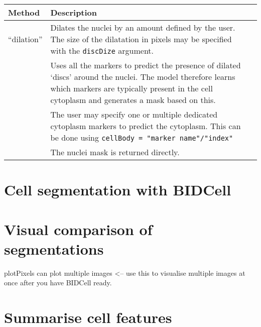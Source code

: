 \documentclass[
  letterpaper,
  DIV=11,
  numbers=noendperiod]{scrreprt}
\begin{document}
\begin{longtable}[]{@{}
  >{\raggedright\arraybackslash}p{}
  >{\centering\arraybackslash}p{}
  >{\centering\arraybackslash}p{}@{}}
\toprule\noalign{}
\begin{minipage}[b]{\linewidth}\raggedright
Method
\end{minipage} & \begin{minipage}[b]{\linewidth}\centering
Description
\end{minipage} & \begin{minipage}[b]{\linewidth}\centering
\end{minipage} \\
\midrule\noalign{}
\endhead
\bottomrule\noalign{}
\endlastfoot
{``dilation''} & {Dilates the nuclei by an amount defined by the user.
The size of the dilatation in pixels may be specified with the
\texttt{discDize} argument.} & \\
{``discModel''} & {Uses all the markers to predict the presence of
dilated `discs' around the nuclei. The model therefore learns which
markers are typically present in the cell cytoplasm and generates a mask
based on this.} & \\
{``marker''} & {The user may specify one or multiple dedicated cytoplasm
markers to predict the cytoplasm. This can be done using
\texttt{cellBody\ =\ "marker\ name"/"index"}} & \\
{``None''} & {The nuclei mask is returned directly.} & \\
\end{longtable}

\section{Cell segmentation with
BIDCell}\label{cell-segmentation-with-bidcell}

\section{Visual comparison of
segmentations}\label{visual-comparison-of-segmentations}

plotPixels can plot multiple images \textless-- use this to visualise
multiple images at once after you have BIDCell ready.

\section{Summarise cell features}\label{summarise-cell-features}
\end{document}
